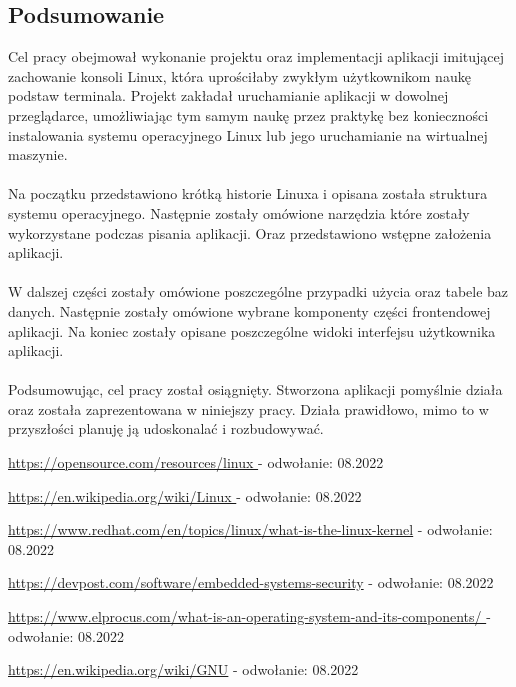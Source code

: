 \documentclass[10pt,a4paper]{report}
\begin{document}
\begin{adjustwidth}{2cm}{2cm}
\chapter*{Podsumowanie}
\begin{minipage}{1\linewidth}
Cel pracy obejmował wykonanie projektu oraz implementacji aplikacji imitującej zachowanie konsoli Linux, która uprościłaby zwykłym użytkownikom naukę podstaw terminala. Projekt zakładał uruchamianie aplikacji w dowolnej przeglądarce, umożliwiając tym samym naukę przez praktykę bez konieczności instalowania systemu operacyjnego Linux lub jego uruchamianie na wirtualnej maszynie. \\ \\
Na początku przedstawiono krótką historie Linuxa i opisana została struktura systemu operacyjnego. Następnie zostały omówione narzędzia które zostały wykorzystane podczas pisania aplikacji. Oraz przedstawiono wstępne założenia aplikacji. \\ \\
W dalszej części zostały omówione poszczególne przypadki użycia oraz tabele baz danych. Następnie zostały omówione wybrane komponenty części frontendowej aplikacji. Na koniec zostały opisane poszczególne widoki interfejsu użytkownika aplikacji. \\ \\
Podsumowując, cel pracy został osiągnięty. Stworzona aplikacji pomyślnie działa oraz została zaprezentowana w niniejszy pracy. Działa prawidłowo, mimo to w przyszłości planuję ją udoskonalać i rozbudowywać. 
\end{minipage}

\begin{thebibliography}{9}
\setlength\itemsep{0.3cm}
\url{https://opensource.com/resources/linux } - odwołanie: 08.2022

\url{https://en.wikipedia.org/wiki/Linux } - odwołanie: 08.2022

\url{https://www.redhat.com/en/topics/linux/what-is-the-linux-kernel} - odwołanie: 08.2022

\url{https://devpost.com/software/embedded-systems-security} - odwołanie: 08.2022

\url{https://www.elprocus.com/what-is-an-operating-system-and-its-components/ } - odwołanie: 08.2022

\url{https://en.wikipedia.org/wiki/GNU} - odwołanie: 08.2022


\end{thebibliography}
\end{adjustwidth}
\end{document}
